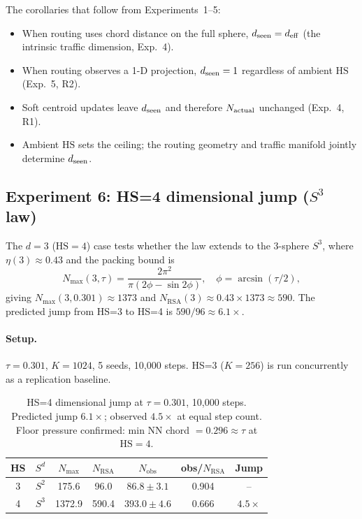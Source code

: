\documentclass[11pt]{article}
\begin{document}
The corollaries that follow from Experiments~1--5:
\begin{itemize}
  \item When routing uses chord distance on the full sphere,
    $d_{\rm seen} = d_{\rm eff}$ (the intrinsic traffic dimension, Exp.~4).
  \item When routing observes a 1-D projection,
    $d_{\rm seen} = 1$ regardless of ambient $\mathrm{HS}$ (Exp.~5, R2).
  \item Soft centroid updates leave $d_{\rm seen}$ and therefore $N_{\rm actual}$
    unchanged (Exp.~4, R1).
  \item Ambient $\mathrm{HS}$ sets the ceiling; the routing geometry and traffic
    manifold jointly determine $d_{\rm seen}$.
\end{itemize}

\subsection{Experiment 6: HS=4 dimensional jump ($S^3$ law)}
\label{sec:hs4}

The $d=3$ ($\mathrm{HS}=4$) case tests whether the law extends to the
3-sphere $S^3$, where $\eta(3) \approx 0.43$ and the packing bound is
\[
  N_{\max}(3,\tau) = \frac{2\pi^2}{\pi(2\phi - \sin 2\phi)}, \quad
  \phi = \arcsin(\tau/2),
\]
giving $N_{\max}(3,0.301) \approx 1373$ and
$N_{\mathrm{RSA}}(3) \approx 0.43 \times 1373 \approx 590$.
The predicted jump from HS=3 to HS=4 is $590/96 \approx 6.1\times$.

\paragraph{Setup.}
$\tau=0.301$, $K=1024$, 5 seeds, 10{,}000 steps.
HS=3 ($K=256$) is run concurrently as a replication baseline.

\begin{table}[h]
\centering
\begin{tabular}{ccccccc}
\toprule
HS & $S^d$ & $N_{\max}$ & $N_{\mathrm{RSA}}$ & $N_{\mathrm{obs}}$ & obs/$N_{\mathrm{RSA}}$ & Jump \\
\midrule
3 & $S^2$ & 175.6  &  96.0  & $86.8 \pm 3.1$ & 0.904 & -- \\
4 & $S^3$ & 1372.9 & 590.4  & $393.0 \pm 4.6$ & 0.666 & $4.5\times$ \\
\bottomrule
\end{tabular}
\caption{HS=4 dimensional jump at $\tau=0.301$, 10{,}000 steps.
Predicted jump $6.1\times$; observed $4.5\times$ at equal step count.
Floor pressure confirmed: min NN chord $= 0.296 \approx \tau$ at $\mathrm{HS}=4$.}
\label{tab:hs4}
\end{table}
\end{document}
